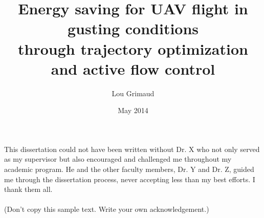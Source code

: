 \documentclass{iitthesis}
\begin{document}
\title{Energy saving for UAV flight in gusting conditions \\
through trajectory optimization \\
and active flow control}
\author{Lou Grimaud}
\date{May 2014}
\maketitle                %


\prelimpages         %


\begin{acknowledgement}     %
\par  This dissertation could not have been written without Dr. X
who not only served as my supervisor but also encouraged and
challenged me throughout my academic program. He and the other
faculty members, Dr. Y and Dr. Z, guided me through the
dissertation process, never accepting less than my best efforts. I
thank them all.\\ \\ (Don't copy this sample text. Write your own
acknowledgement.)
\end{acknowledgement}


\tableofcontents
\clearpage

\listoftables

\clearpage

\listoffigures

\clearpage


\listofsymbols


 \clearpage


\begin{abstract}           %
\end{abstract}
\end{document}
